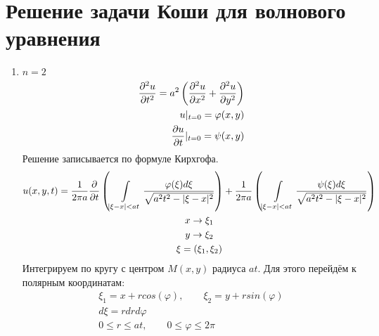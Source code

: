 \documentclass[../main.tex]{subfiles}
\begin{document}
\section{Решение задачи Коши для волнового уравнения}
\begin{enumerate}
	\item $n=2$
	      \begin{equation}
		      \label{eq:2.7.1_z}
		      \begin{split}
			      \frac{\partial ^2u}{\partial t^2} = a^2\left(\frac{\partial ^2u}{\partial x^2}+\frac{\partial ^2u}{\partial y^2}\right)\\
			      u|_{t=0} = \varphi(x,y)\\
			      \frac{\partial u}{\partial t}|_{t=0} = \psi(x,y)
		      \end{split}
	      \end{equation}
	      Решение записывается по формуле Кирхгофа.
	      \begin{gather*}
		      u(x,y,t) = \frac{1}{2\pi a}\frac{\partial  }{\partial t}\left(
		      \int\displaylimits_{|\xi-x|<at} \frac{\varphi(\xi)d\xi}{\sqrt{a^2t^2 - |\xi-x|^2}}\right)
		      +
		      \frac{1}{2\pi a}\left(
		      \int\displaylimits_{|\xi-x|<at} \frac{\psi(\xi)d\xi}{\sqrt{a^2t^2 - |\xi-x|^2}}\right)\\
		      x \rightarrow \xi_1\\
		      y \rightarrow \xi_2\\
		      \xi = (\xi_1,\xi_2)
	      \end{gather*}
	      Интегрируем по кругу с центром $M(x,y)$ радиуса $at$. Для этого перейдём к
	      полярным координатам:
	      \begin{gather*}
		      \xi_1 = x + r cos(\varphi), \qquad \xi_2 = y + r sin(\varphi)\\
		      d\xi = r dr d\varphi \\
		      0 \leq r \leq at, \qquad 0 \leq \varphi \leq 2\pi
	      \end{gather*}


\end{enumerate}
\end{document}
